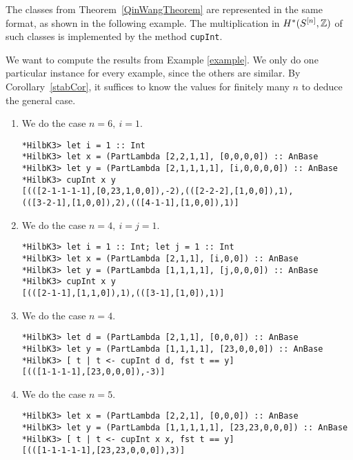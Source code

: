 The classes from Theorem~\ref{QinWangTheorem} are represented in the same format, as shown in the following example. The multiplication in $H^*(S^{[n]},\mathbb{Z})$ of such classes is implemented by the method \verb|cupInt|.
\begin{example}\label{exampleSource} We want to compute the results from Example \ref{example}. We only do one particular instance for every example, since the others are similar. By Corollary~\ref{stabCor}, it suffices to know the values for finitely many $n$ to deduce the general case.
\begin{enumerate}
\item We do the case $n=6,\ i=1$. 
\begin{Verbatim}[fontsize=\small]
*HilbK3> let i = 1 :: Int
*HilbK3> let x = (PartLambda [2,2,1,1], [0,0,0,0]) :: AnBase
*HilbK3> let y = (PartLambda [2,1,1,1,1], [i,0,0,0,0]) :: AnBase
*HilbK3> cupInt x y
[(([2-1-1-1-1],[0,23,1,0,0]),-2),(([2-2-2],[1,0,0]),1),
(([3-2-1],[1,0,0]),2),(([4-1-1],[1,0,0]),1)]
\end{Verbatim}
\item We do the case $n=4,\ i=j=1$. 
\begin{Verbatim}[fontsize=\small]
*HilbK3> let i = 1 :: Int; let j = 1 :: Int
*HilbK3> let x = (PartLambda [2,1,1], [i,0,0]) :: AnBase
*HilbK3> let y = (PartLambda [1,1,1,1], [j,0,0,0]) :: AnBase
*HilbK3> cupInt x y
[(([2-1-1],[1,1,0]),1),(([3-1],[1,0]),1)]
\end{Verbatim}
\item We do the case $n=4$. 
\begin{Verbatim}[fontsize=\small]
*HilbK3> let d = (PartLambda [2,1,1], [0,0,0]) :: AnBase
*HilbK3> let y = (PartLambda [1,1,1,1], [23,0,0,0]) :: AnBase
*HilbK3> [ t | t <- cupInt d d, fst t == y]
[(([1-1-1-1],[23,0,0,0]),-3)]
\end{Verbatim}
\item We do the case $n=5$. 
\begin{Verbatim}[fontsize=\small]
*HilbK3> let x = (PartLambda [2,2,1], [0,0,0]) :: AnBase
*HilbK3> let y = (PartLambda [1,1,1,1,1], [23,23,0,0,0]) :: AnBase
*HilbK3> [ t | t <- cupInt x x, fst t == y]
[(([1-1-1-1-1],[23,23,0,0,0]),3)]
\end{Verbatim}
\end{enumerate}
\end{example}

